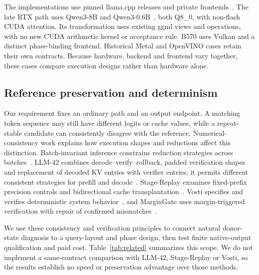 The implementations use pinned llama.cpp releases and private frontends~\cite{llamacpp}. The late RTX path uses Qwen3-8B and Qwen3-0.6B~\cite{qwen3}, both Q8\_0, with non-flash CUDA attention. Its transformation uses existing ggml views and operations, with no new CUDA arithmetic kernel or acceptance rule. B570 uses Vulkan and a distinct phase-binding frontend. Historical Metal and OpenVINO cases retain their own contracts. Because hardware, backend and frontend vary together, these cases compare execution designs rather than hardware alone.

\subsection{Reference preservation and determinism}
Our requirement fixes an ordinary path and an output endpoint. A matching token sequence may still have different logits or cache values, while a repeat-stable candidate can consistently disagree with the reference. Numerical-consistency work explains how execution shapes and reductions affect this distinction. Batch-invariant inference constrains reduction strategies across batches~\cite{thinkingmachines}. LLM-42 combines decode--verify--rollback, padded verification shapes and replacement of decoded KV entries with verifier entries; it permits different consistent strategies for prefill and decode~\cite{llm42}. Stage-Replay examines fixed-prefix precision controls and bidirectional cache transplantation~\cite{stagereplay}. Vosti specifies and verifies deterministic system behavior~\cite{vosti}, and MarginGate uses margin-triggered verification with repair of confirmed mismatches~\cite{margingate}.

We use these consistency and verification principles to connect natural donor-state diagnosis to a query-layout and phase design, then test finite native-output qualification and paid cost. Table~\ref{tab:related} summarizes this scope. We do not implement a same-contract comparison with LLM-42, Stage-Replay or Vosti, so the results establish no speed or preservation advantage over those methods.

